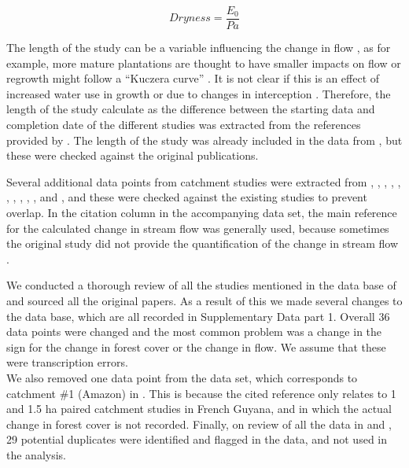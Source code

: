 \documentclass[]{elsarticle} %
\begin{document}
\begin{equation}
Dryness = \frac{E_{0}}{Pa} \label{eq:eq1}
\end{equation}

The length of the study can be a variable influencing the change in flow \citep[e.g.][]{jackson2005, filoso2017}, as for example, more mature plantations are thought to have smaller impacts on flow or regrowth might follow a ``Kuczera curve'' \citep{kuczera1987}. It is not clear if this is an effect of increased water use in growth \citep{vertessy2001} or due to changes in interception \citep{stoof2012}. Therefore, the length of the study calculate as the difference between the starting data and completion date of the different studies was extracted from the references provided by \citet{zhang2017}. The length of the study was already included in the data from \citet{filoso2017}, but these were checked against the original publications.

Several additional data points from catchment studies were extracted from \citet{almeida2016}, \citet{ferreto2020}, \citet{iroume2013}, \citet{iroume2006}, \citet{zhang2011}, \citet{zhao2010}, \citet{borg1988}, \citet{thornton2007}, \citet{zhou2010}, \citet{rodriguez2010}, \citet{ruprechtetal1991} and \citet{penaarancibia2012}, and these were checked against the existing studies to prevent overlap. In the citation column in the accompanying data set, the main reference for the calculated change in stream flow was generally used, because sometimes the original study did not provide the quantification of the change in stream flow \citep[i.e.~Table 6 in][]{zhang2011}.

We conducted a thorough review of all the studies mentioned in the data base of \citet{zhang2017} and sourced all the original papers. As a result of this we made several changes to the data base, which are all recorded in Supplementary Data part 1. Overall 36 data points were changed and the most common problem was a change in the sign for the change in forest cover or the change in flow. We assume that these were transcription errors.\\
We also removed one data point from the data set, which corresponds to catchment \#1 (Amazon) in \citet{zhang2017}. This is because the cited reference \citep{roche1981} only relates to 1 and 1.5 ha paired catchment studies in French Guyana, and in which the actual change in forest cover is not recorded. Finally, on review of all the data in \citet{zhang2017} and \citet{filoso2017}, 29 potential duplicates were identified and flagged in the data, and not used in the analysis.
\end{document}
